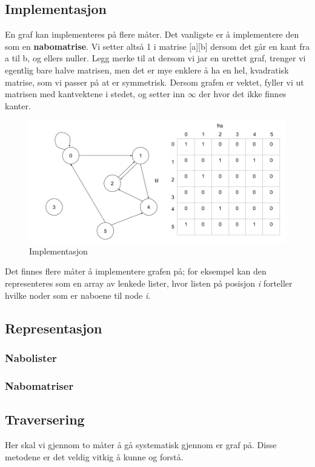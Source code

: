 \subsection{Implementasjon}
En graf kan implementeres på flere måter. Det vanligste er å implementere den som en \textbf{nabomatrise}. Vi setter altså 1 i matrise [a][b] dersom det går en kant fra a til b, og ellers nuller. Legg merke til at dersom vi jar en urettet graf, trenger vi egentlig bare halve matrisen, men det er mye enklere å ha en hel, kvadratisk matrise, som vi passer på at er symmetrisk. Dersom grafen er vektet, fyller vi ut matrisen med kantvektene i stedet, og setter inn $\infty$ der hvor det ikke finnes kanter.

\begin{figure}[H]
\includegraphics[scale=0.5]{images/implementasjon}
\centering %
\caption{Implementasjon}
\label{fig:implementasjon}
\end{figure}

\noindent Det finnes flere måter å implementere grafen på; for eksempel kan den representeres som en array av lenkede lister, hvor listen på posisjon \textit{i} forteller hvilke noder som er naboene til node \textit{i}.

\subsection{Representasjon}
\subsubsection{Nabolister}
\subsubsection{Nabomatriser}
\subsection{Traversering}
Her skal vi gjennom to måter å gå systematisk gjennom er graf på. Disse metodene er det veldig vitkig å kunne og forstå.


